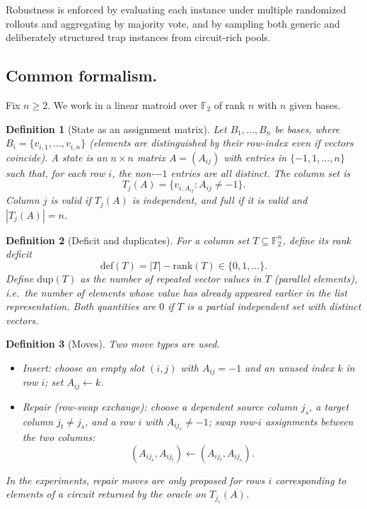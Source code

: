 \documentclass[11pt]{amsart}
\newtheorem{definition}{Definition}
\begin{document}
Robustness is enforced by evaluating each instance under multiple randomized rollouts and aggregating by majority vote, and by sampling both generic and deliberately structured trap instances from circuit-rich pools.

\subsection{Common formalism.}

Fix $n\ge 2$.
We work in a linear matroid over $\mathbb{F}_2$ of rank $n$ with $n$ given bases.

\begin{definition}[State as an assignment matrix]
Let $B_1,\dots,B_n$ be bases, where
$B_i=\{v_{i,1},\dots,v_{i,n}\}$ (elements are distinguished by their row-index even if vectors coincide).
A \emph{state} is an $n\times n$ matrix $A=(A_{ij})$ with entries in $\{-1,1,\dots,n\}$ such that, for each row $i$, the non-$-1$ entries are all distinct.
The \emph{column set} is
\[
T_j(A)=\{v_{i,A_{ij}}: A_{ij}\ne -1\}.
\]
Column $j$ is \emph{valid} if $T_j(A)$ is independent, and \emph{full} if it is valid and $|T_j(A)|=n$.
\end{definition}

\begin{definition}[Deficit and duplicates]
For a column set $T\subseteq \mathbb{F}_2^n$, define its \emph{rank deficit}
\[
\mathrm{def}(T)=|T|-\mathrm{rank}(T)\in\{0,1,\dots\}.
\]
Define $\mathrm{dup}(T)$ as the number of repeated vector values in $T$ (parallel elements), i.e.\ the number of elements whose value has already appeared earlier in the list representation.
Both quantities are $0$ if $T$ is a partial independent set with distinct vectors.
\end{definition}

\begin{definition}[Moves]
Two move types are used.
\begin{itemize}
    \item \emph{Insert:} choose an empty slot $(i,j)$ with $A_{ij}=-1$ and an unused index $k$ in row $i$; set $A_{ij}\leftarrow k$.
    \item \emph{Repair (row-swap exchange):} choose a dependent \emph{source} column $j_s$, a \emph{target} column $j_t\ne j_s$, and a row $i$ with $A_{ij_s}\ne -1$; swap row-$i$ assignments between the two columns:
\[
(A_{ij_s},A_{ij_t}) \leftarrow (A_{ij_t},A_{ij_s}).
\]
\end{itemize}
In the experiments, repair moves are only proposed for rows $i$ corresponding to elements of a circuit returned by the oracle on $T_{j_s}(A)$.

\end{definition}
\end{document}
